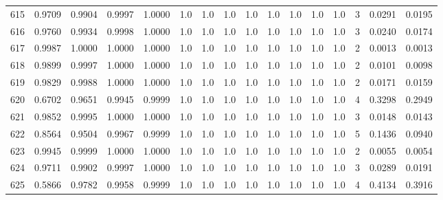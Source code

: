 \begin{tabular}{lrrrrrrrrrrrrrrr}
615 &      0.9709 &  0.9904 &  0.9997 &  1.0000 &     1.0 &     1.0 &     1.0 &     1.0 &     1.0 &     1.0 &      1.0 &        1.0 &      3 &                    0.0291 &                     0.0195 \\
616 &      0.9760 &  0.9934 &  0.9998 &  1.0000 &     1.0 &     1.0 &     1.0 &     1.0 &     1.0 &     1.0 &      1.0 &        1.0 &      3 &                    0.0240 &                     0.0174 \\
617 &      0.9987 &  1.0000 &  1.0000 &  1.0000 &     1.0 &     1.0 &     1.0 &     1.0 &     1.0 &     1.0 &      1.0 &        1.0 &      2 &                    0.0013 &                     0.0013 \\
618 &      0.9899 &  0.9997 &  1.0000 &  1.0000 &     1.0 &     1.0 &     1.0 &     1.0 &     1.0 &     1.0 &      1.0 &        1.0 &      2 &                    0.0101 &                     0.0098 \\
619 &      0.9829 &  0.9988 &  1.0000 &  1.0000 &     1.0 &     1.0 &     1.0 &     1.0 &     1.0 &     1.0 &      1.0 &        1.0 &      2 &                    0.0171 &                     0.0159 \\
620 &      0.6702 &  0.9651 &  0.9945 &  0.9999 &     1.0 &     1.0 &     1.0 &     1.0 &     1.0 &     1.0 &      1.0 &        1.0 &      4 &                    0.3298 &                     0.2949 \\
621 &      0.9852 &  0.9995 &  1.0000 &  1.0000 &     1.0 &     1.0 &     1.0 &     1.0 &     1.0 &     1.0 &      1.0 &        1.0 &      3 &                    0.0148 &                     0.0143 \\
622 &      0.8564 &  0.9504 &  0.9967 &  0.9999 &     1.0 &     1.0 &     1.0 &     1.0 &     1.0 &     1.0 &      1.0 &        1.0 &      5 &                    0.1436 &                     0.0940 \\
623 &      0.9945 &  0.9999 &  1.0000 &  1.0000 &     1.0 &     1.0 &     1.0 &     1.0 &     1.0 &     1.0 &      1.0 &        1.0 &      2 &                    0.0055 &                     0.0054 \\
624 &      0.9711 &  0.9902 &  0.9997 &  1.0000 &     1.0 &     1.0 &     1.0 &     1.0 &     1.0 &     1.0 &      1.0 &        1.0 &      3 &                    0.0289 &                     0.0191 \\
625 &      0.5866 &  0.9782 &  0.9958 &  0.9999 &     1.0 &     1.0 &     1.0 &     1.0 &     1.0 &     1.0 &      1.0 &        1.0 &      4 &                    0.4134 &                     0.3916 \\

\end{tabular}
